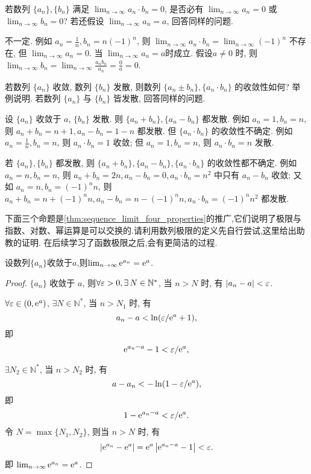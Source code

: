 \begin{exercise}[1.2.10]
    若数列 $\{a_n\}, \{b_n\}$ 满足 $\lim_{n\to\infty} a_n \cdot b_n = 0$, 是否必有 $\lim_{n\to\infty} a_n = 0$ 或 $\lim_{n\to\infty} b_n = 0$?
    若还假设 $\lim_{n\to\infty} a_n = a$, 回答同样的问题.
\end{exercise}

\begin{solution}
    不一定. 例如 $a_n = \frac{1}{n}, b_n = n(-1)^n$, 则 $\lim_{n\to\infty} a_n \cdot b_n = \lim_{n\to\infty} (-1)^n$ 不存在, 但 $\lim_{n\to\infty} a_n = 0$.
    当 $\lim_{n\to\infty} a_n = a$时成立. 假设$a \ne 0$ 时, 则$\lim_{n\to\infty} b_n = \lim_{n\to\infty} \frac{a_n b_n}{a_n} = \frac{0}{a} = 0$.
\end{solution}

\begin{exercise}[1.2.11]
    若数列 $\{a_n\}$ 收敛, 数列 $\{b_n\}$ 发散, 则数列 $\{a_n \pm b_n\}, \{a_n \cdot b_n\}$ 的收敛性如何? 举例说明. 若数列 $\{a_n\}$ 与 $\{b_n\}$ 皆发散, 回答同样的问题.
\end{exercise}

\begin{solution}
    设 $\{a_n\}$ 收敛于 $a$, $\{b_n\}$ 发散. 则 $\{a_n + b_n\}, \{a_n - b_n\}$ 都发散. 例如 $a_n = 1, b_n = n$, 则 $a_n + b_n = n + 1, a_n - b_n = 1 - n$ 都发散. 但 $\{a_n \cdot b_n\}$ 的收敛性不确定. 例如 $a_n = \frac{1}{n}, b_n = n$, 则 $a_n \cdot b_n = 1$ 收敛; 但 $a_n = 1, b_n = n$, 则 $a_n \cdot b_n = n$ 发散.

    若 $\{a_n\}, \{b_n\}$ 都发散, 则 $\{a_n + b_n\}, \{a_n - b_n\}, \{a_n \cdot b_n\}$ 的收敛性都不确定. 例如 $a_n = n, b_n = n$, 则 $a_n + b_n = 2n, a_n - b_n = 0, a_n \cdot b_n = n^2$ 中只有 $a_n - b_n$ 收敛; 又如 $a_n = n, b_n = (-1)^n n$, 则 $a_n + b_n = n + (-1)^n n, a_n - b_n = n - (-1)^n n, a_n \cdot b_n = (-1)^n n^2$ 都发散.
\end{solution}

下面三个命题是\autoref{thm:sequence_limit_four_properties}的推广,它们说明了极限与指数、对数、幂运算是可以交换的.请利用数列极限的定义先自行尝试,这里给出助教的证明.
在后续学习了函数极限之后,会有更简洁的过程.

\begin{proposition}
    设数列$\{a_n\}$收敛于$a$,则$\lim_{n \to \infty} \mathrm{e}^{a_n} = \mathrm{e}^a$.
\end{proposition}

\begin{proof}
    $\{ a_n \}$ 收敛于 $a$, 则$\forall \ve > 0, \exists N \in \mathbb{N}^*$, 当 $n > N$ 时, 有 $|a_n - a| < \varepsilon$.

    $\forall \varepsilon \in \left( 0, \mathrm{e}^a \right)$, $\exists N \in \mathbb{N}^*$, 当 $n > N_1$ 时, 有
    $$a_n - a < \ln(\varepsilon/\mathrm{e}^a + 1), $$
    即
    $$\mathrm{e}^{a_n - a} - 1 < \varepsilon/\mathrm{e}^a, $$

    $\exists N_2 \in \mathbb{N}^*$, 当 $n > N_2$ 时, 有
    $$a - a_n < - \ln(1 - \varepsilon/\mathrm{e}^a), $$
    即
    $$1 - \mathrm{e}^{a_n - a} < \varepsilon/\mathrm{e}^a.$$
    令 $N = \max\{N_1, N_2\}$, 则当 $n > N$ 时, 有
    $$ \left| \mathrm{e}^{a_n} - \mathrm{e}^a \right| = \mathrm{e}^a \left| \mathrm{e}^{a_n - a} - 1 \right| < \varepsilon.$$
    即 $\lim_{n \to \infty} \mathrm{e}^{a_n} = \mathrm{e}^a$.
\end{proof}

